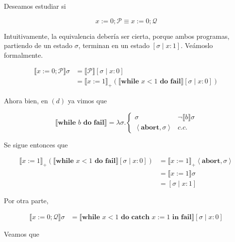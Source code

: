 \documentclass[article, 12pt]{article}
\begin{document}
Deseamos estudiar si

\begin{equation*}
  x := 0; \mathcal{P} \equiv x:=0;\mathcal{Q}
\end{equation*}

Intuitivamente, la equivalencia debería ser cierta, porque ambos programas,
partiendo de un estado $\sigma$,
terminan en un estado $[\sigma \mid x : 1]$. Veámoslo formalmente.

\begin{align*}
  \llbracket x:=0;\mathcal{P} \rrbracket \sigma
  &=\llbracket \mathcal{P} \rrbracket[\sigma \mid x : 0] \\ 
  &=\llbracket x := 1 \rrbracket_{+} \left( \llbracket \textbf{while } x < 1
  \textbf{ do } \textbf{fail} \rrbracket [\sigma \mid x : 0] \right) 
\end{align*}

Ahora bien, en $(d)$ ya vimos que 

\begin{equation*}
  \llbracket \textbf{while } b \textbf{ do } \textbf{fail} \rrbracket =
  \lambda\sigma. \begin{cases}
    \sigma & \neg \llbracket b \rrbracket\sigma \\ 
    \left<\textbf{abort}, \sigma \right> & c.c.
  \end{cases}
\end{equation*}

Se sigue entonces que 

\begin{align*}
  \llbracket x := 1 \rrbracket_{+}\left( \llbracket \textbf{while } x < 1
  \textbf{ do }  \textbf{fail} \rrbracket[\sigma \mid x : 0] \right) 
  &= \llbracket x := 1 \rrbracket_+ \left<\textbf{abort}, \sigma \right> \\ 
  &= \llbracket x := 1 \rrbracket\sigma \\ 
  &=[\sigma \mid x : 1]
\end{align*}

Por otra parte, 

\begin{align*}
  \llbracket x:=0;\mathcal{Q} \rrbracket\sigma  
  &= \llbracket \textbf{while } x < 1 \textbf{ do } \textbf{catch } x := 1
  \textbf{ in fail} \rrbracket[\sigma \mid x : 0]
\end{align*}

Veamos que 
\end{document}
